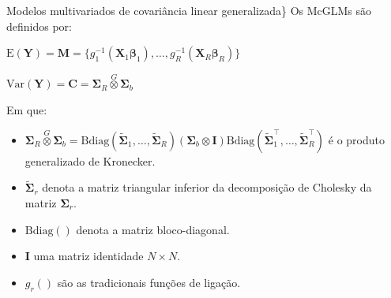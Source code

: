 \documentclass[
  ignorenonframetext,
  serif,
  professionalfont,
  usenames,
  dvipsnames,
  aspectratio = 169]{beamer}
\begin{document}
\begin{frame}{Modelos multivariados de covariância linear
generalizada\}}
\protect\hypertarget{modelos-multivariados-de-covariuxe2ncia-linear-generalizada-6}{}
Os McGLMs são definidos por:

\begin{center}
$\mathrm{E}(\boldsymbol{Y}) = \boldsymbol{M} = \{g_1^{-1}(\boldsymbol{X}_1 \boldsymbol{\beta}_1), \ldots, g_R^{-1}(\boldsymbol{X}_R \boldsymbol{\beta}_R)\}$

$\mathrm{Var}(\boldsymbol{Y}) = \boldsymbol{C} = \boldsymbol{\Sigma}_R \overset{G} \otimes \boldsymbol{\Sigma}_b$

\end{center}

Em que:

\begin{itemize}
  
  \item $\boldsymbol{\Sigma}_R \overset{G} \otimes \boldsymbol{\Sigma}_b = \mathrm{Bdiag}(\tilde{\boldsymbol{\Sigma}}_1, \ldots, \tilde{\boldsymbol{\Sigma}}_R) (\boldsymbol{\Sigma}_b \otimes \boldsymbol{I}) \mathrm{Bdiag}(\tilde{\boldsymbol{\Sigma}}_1^\top, \ldots, \tilde{\boldsymbol{\Sigma}}_R^\top)$ é o produto generalizado de Kronecker.
  
  \item $\tilde{\boldsymbol{\Sigma}}_r$ denota a matriz triangular inferior da decomposição de Cholesky da matriz ${\boldsymbol{\Sigma}}_r$.
  
  \item $\mathrm{Bdiag()}$ denota a matriz bloco-diagonal.
  
  \item $\boldsymbol{I}$ uma matriz identidade $N \times N$.
  
  \item $g_r()$ são as tradicionais funções de ligação.
  
\end{itemize}
\end{frame}
\end{document}
